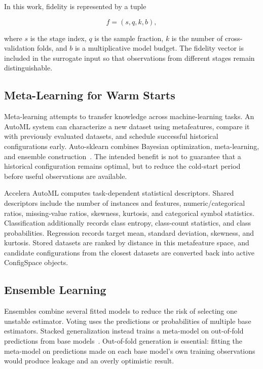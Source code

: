 \documentclass[12pt,a4paper]{report}
\begin{document}
\noindent In this work, fidelity is represented by a tuple

\begin{equation}
  f = (s, q, k, b),
\end{equation}

\noindent where $s$ is the stage index, $q$ is the sample fraction, $k$ is the
number of cross-validation folds, and $b$ is a multiplicative model budget. The
fidelity vector is included in the surrogate input so that observations from
different stages remain distinguishable.

\subsection{Meta-Learning for Warm Starts}
Meta-learning attempts to transfer knowledge across machine-learning tasks. An
AutoML system can characterize a new dataset using metafeatures, compare it
with previously evaluated datasets, and schedule successful historical
configurations early. Auto-sklearn combines Bayesian optimization,
meta-learning, and ensemble construction~\cite{autosklearn}. The intended
benefit is not to guarantee that a historical configuration remains optimal, but
to reduce the cold-start period before useful observations are available.

\medskip
\noindent Accelera AutoML computes task-dependent statistical descriptors.
Shared descriptors include the number of instances and features,
numeric/categorical ratios, missing-value ratios, skewness, kurtosis, and
categorical symbol statistics. Classification additionally records class
entropy, class-count statistics, and class probabilities. Regression records
target mean, standard deviation, skewness, and kurtosis. Stored datasets are
ranked by distance in this metafeature space, and candidate configurations from
the closest datasets are converted back into active ConfigSpace objects.

\subsection{Ensemble Learning}
Ensembles combine several fitted models to reduce the risk of selecting one
unstable estimator. Voting uses the predictions or probabilities of multiple
base estimators. Stacked generalization instead trains a meta-model on
out-of-fold predictions from base models~\cite{stacking}. Out-of-fold
generation is essential: fitting the meta-model on predictions made on each
base model's own training observations would produce leakage and an overly
optimistic result.
\end{document}
